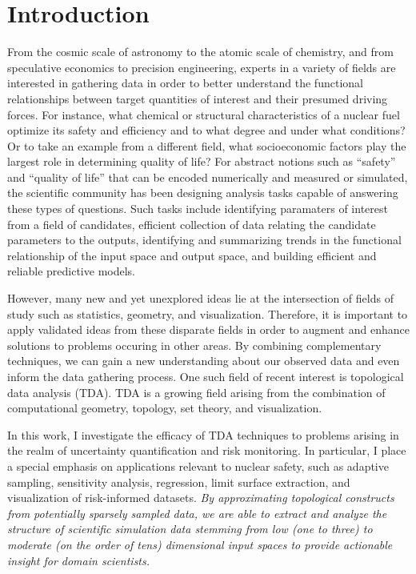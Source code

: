 
\chapter{Introduction}
\label{ch:introduction}
From the cosmic scale of astronomy to the atomic scale of chemistry, and from speculative economics to precision engineering, experts in a variety of fields are interested in gathering data in order to better understand the functional relationships between target quantities of interest and their presumed driving forces.
%
For instance, what chemical or structural characteristics of a nuclear fuel optimize its safety and efficiency and to what degree and under what conditions?
%
Or to take an example from a different field, what socioeconomic factors play the largest role in determining quality of life?
%
For abstract notions such as ``safety'' and ``quality of life'' that can be encoded numerically and measured or simulated, the scientific community has been designing analysis tasks capable of answering these types of questions.
%
Such tasks include identifying paramaters of interest from a field of candidates, efficient collection of data relating the candidate parameters to the outputs, identifying and summarizing trends in the functional relationship of the input space and output space, and building efficient and reliable predictive models.

However, many new and yet unexplored ideas lie at the intersection of fields of study such as statistics, geometry, and visualization.
%
Therefore, it is important to apply validated ideas from these disparate fields in order to augment and enhance solutions to problems occuring in other areas.
%
By combining complementary techniques, we can gain a new understanding about our observed data and even inform the data gathering process.
%
One such field of recent interest is topological data analysis (TDA).
%
TDA is a growing field arising from the combination of computational geometry, topology, set theory, and visualization.

In this work, I investigate the efficacy of TDA techniques to problems arising in the realm of uncertainty quantification and risk monitoring.
%
In particular, I place a special emphasis on applications relevant to nuclear safety, such as adaptive sampling, sensitivity analysis, regression, limit surface extraction, and visualization of risk-informed datasets.
%
\textit{By approximating topological constructs from potentially sparsely sampled data, we are able to extract and analyze the structure of scientific simulation data stemming from low (one to three) to moderate (on the order of tens) dimensional input spaces to provide actionable insight for domain scientists.}

